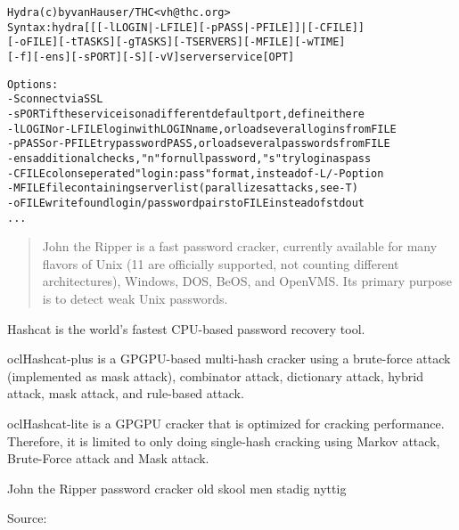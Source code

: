 \documentclass[Screen16to9,17pt]{foils}
\begin{document}
\begin{alltt}\small
Hydra (c) by van Hauser / THC <vh@thc.org>
Syntax: hydra [[[-l LOGIN|-L FILE] [-p PASS|-P FILE]] | [-C FILE]]
[-o FILE] [-t TASKS] [-g TASKS] [-T SERVERS] [-M FILE] [-w TIME]
[-f] [-e ns] [-s PORT] [-S] [-vV] server service [OPT]

Options:
  -S        connect via SSL
  -s PORT   if the service is on a different default port, define it here
  -l LOGIN  or -L FILE login with LOGIN name, or load several logins from FILE
  -p PASS   or -P FILE try password PASS, or load several passwords from FILE
  -e ns     additional checks, "n" for null password, "s" try login as pass
  -C FILE   colon seperated "login:pass" format, instead of -L/-P option
  -M FILE   file containing server list (parallizes attacks, see -T)
  -o FILE   write found login/password pairs to FILE instead of stdout
...
\end{alltt}



\begin{quote}
John the Ripper is a fast password cracker, currently available for
many flavors of Unix (11 are officially supported, not counting
different architectures), Windows, DOS, BeOS, and OpenVMS. Its primary
purpose is to detect weak Unix passwords.
\end{quote}

\begin{list2}
\item Hashcat is the world's fastest CPU-based password recovery tool.
\item oclHashcat-plus is a GPGPU-based multi-hash cracker using a brute-force attack (implemented as mask attack), combinator attack, dictionary attack, hybrid attack, mask attack, and rule-based attack.
\item oclHashcat-lite is a GPGPU cracker that is optimized for cracking performance. Therefore, it is limited to only doing single-hash cracking using Markov attack, Brute-Force attack and Mask attack.
\item John the Ripper password cracker old skool men stadig nyttig
\end{list2}

Source:\\
\\


\end{document}
